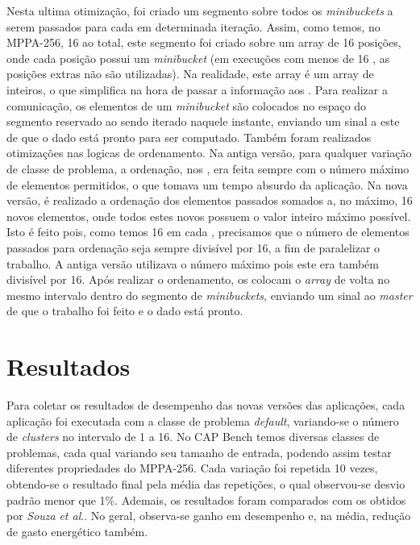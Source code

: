 \documentclass[a4paper,11pt]{article}
\newcommand{\etal}{\textit{et al}.\xspace}
\newcommand{\mppa}{MPPA-256\xspace}
\newcommand{\capb}{CAP Bench\xspace}
\begin{document}
Nesta ultima otimização, foi criado um segmento sobre todos os \textit{minibuckets} a serem passados para cada \cc em determinada iteração. Assim, como temos, no \mppa, 16 \ccs ao total, este segmento foi criado sobre um array de 16 posições, onde cada posição possui um \textit{minibucket} (em execuções com menos de 16 \ccs, as posições extras não são utilizadas). Na realidade, este array é um array de inteiros, o que simplifica na hora de passar a informação aos \ccs. Para realizar a comunicação, os elementos de um \textit{minibucket} são colocados no espaço do segmento reservado ao \cc sendo iterado naquele instante, enviando um sinal a este \cc de que o dado está pronto para ser computado. Também foram realizados otimizações nas logicas de ordenamento. Na antiga versão, para qualquer variação de classe de problema, a ordenação, nos \ccs, era feita sempre com o número máximo de elementos permitidos, o que tomava um tempo absurdo da aplicação. Na nova versão, é realizado a ordenação dos elementos passados somados a, no máximo, 16 novos elementos, onde todos estes novos possuem o valor inteiro máximo possível. Isto é feito pois, como temos 16 \pes em cada \cc, precisamos que o número de elementos passados para ordenação seja sempre divisível por 16, a fim de paralelizar o trabalho. A antiga versão utilizava o número máximo pois este era também divisível por 16. Após realizar o ordenamento, os \ccs colocam o \textit{array} de volta no mesmo intervalo dentro do segmento de \textit{minibuckets}, enviando um sinal ao \textit{master} de que o trabalho foi feito e o dado está pronto.

\section{Resultados}
\label{sec:resultados}

Para coletar os resultados de desempenho das novas versões das aplicações, cada aplicação foi executada com a classe de problema \textit{default}, variando-se o número de \textit{clusters} no intervalo de 1 a 16. No \capb temos diversas classes de problemas, cada qual variando seu tamanho de entrada, podendo assim testar diferentes propriedades do \mppa. Cada variação foi repetida 10 vezes, obtendo-se o resultado final pela média das repetições, o qual observou-se desvio padrão menor que 1\%. Ademais, os resultados foram comparados com os obtidos por \textit{Souza} \etal \cite{Castro-Souza-CCPE:2016}. No geral, observa-se ganho em desempenho e, na média, redução de gasto energético também. 
\end{document}
